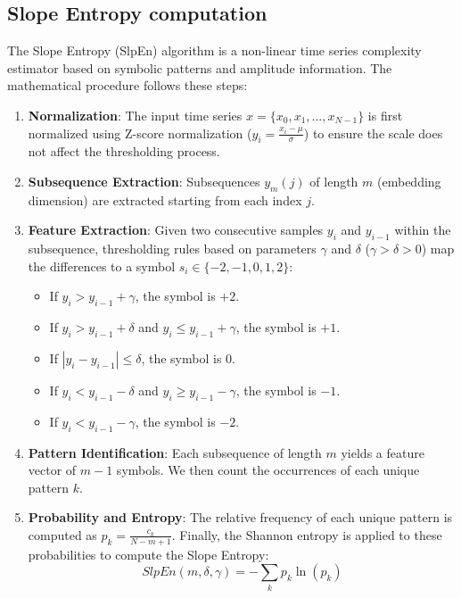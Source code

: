\documentclass{article}
\begin{document}
\subsection{Slope Entropy computation}
The Slope Entropy (SlpEn) algorithm is a non-linear time series complexity estimator based on symbolic patterns and amplitude information. The mathematical procedure follows these steps:
\begin{enumerate}
    \item \textbf{Normalization}: The input time series $x = \{x_0, x_1, \dots, x_{N-1}\}$ is first normalized using Z-score normalization ($y_i = \frac{x_i - \mu}{\sigma}$) to ensure the scale does not affect the thresholding process.
    \item \textbf{Subsequence Extraction}: Subsequences $y_m(j)$ of length $m$ (embedding dimension) are extracted starting from each index $j$.
    \item \textbf{Feature Extraction}: Given two consecutive samples $y_i$ and $y_{i-1}$ within the subsequence, thresholding rules based on parameters $\gamma$ and $\delta$ ($\gamma > \delta > 0$) map the differences to a symbol $s_i \in \{-2, -1, 0, 1, 2\}$:
    \begin{itemize}
        \item If $y_i > y_{i-1} + \gamma$, the symbol is $+2$.
        \item If $y_i > y_{i-1} + \delta$ and $y_i \le y_{i-1} + \gamma$, the symbol is $+1$.
        \item If $|y_i - y_{i-1}| \le \delta$, the symbol is $0$.
        \item If $y_i < y_{i-1} - \delta$ and $y_i \ge y_{i-1} - \gamma$, the symbol is $-1$.
        \item If $y_i < y_{i-1} - \gamma$, the symbol is $-2$.
    \end{itemize}
    \item \textbf{Pattern Identification}: Each subsequence of length $m$ yields a feature vector of $m-1$ symbols. We then count the occurrences of each unique pattern $k$.
    \item \textbf{Probability and Entropy}: The relative frequency of each unique pattern is computed as $p_k = \frac{c_k}{N - m + 1}$. Finally, the Shannon entropy is applied to these probabilities to compute the Slope Entropy:
    \begin{equation}
        SlpEn(m, \delta, \gamma) = - \sum_{k} p_k \ln(p_k)
    \end{equation}
\end{enumerate}
\end{document}
